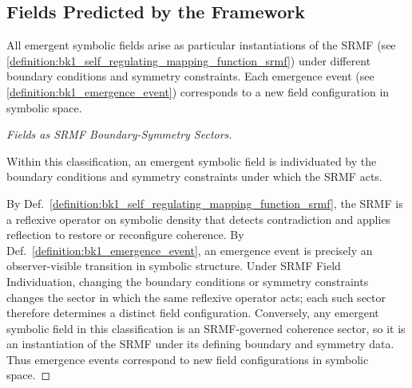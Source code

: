 \subsection{Fields Predicted by the Framework}
\label{subsec:bk1_fields_predicted_by_the_framework}

\begin{theorem}
\label{theorem:bk1_unified_field_classification}
All emergent symbolic fields arise as particular instantiations of the SRMF (see \ref{definition:bk1_self_regulating_mapping_function_srmf}) under different boundary conditions and symmetry constraints. Each emergence event (see \ref{definition:bk1_emergence_event}) corresponds to a new field configuration in symbolic space.
\end{theorem}
\begin{proof}[Fields as SRMF Boundary-Symmetry Sectors]
\label{proof:bk1_unified_field_classification}
\leavevmode

\begin{assumption}
Within this classification, an emergent symbolic field is individuated by the
boundary conditions and symmetry constraints under which the SRMF acts.
\end{assumption}

By Def.~\ref{definition:bk1_self_regulating_mapping_function_srmf}, the SRMF is
a reflexive operator on symbolic density that detects contradiction and applies
reflection to restore or reconfigure coherence. By
Def.~\ref{definition:bk1_emergence_event}, an emergence event is precisely an
observer-visible transition in symbolic structure. Under SRMF Field
Individuation, changing the boundary conditions or symmetry constraints changes
the sector in which the same reflexive operator acts; each such sector therefore
determines a distinct field configuration. Conversely, any emergent symbolic
field in this classification is an SRMF-governed coherence sector, so it is an
instantiation of the SRMF under its defining boundary and symmetry data. Thus
emergence events correspond to new field configurations in symbolic space.
\end{proof}

